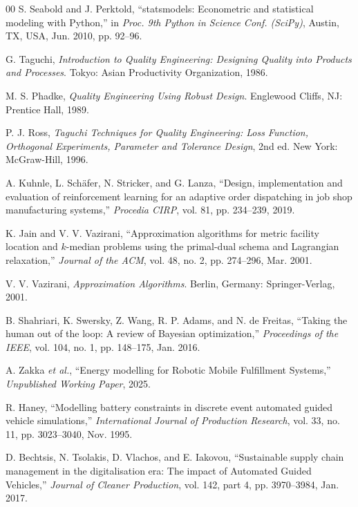 \documentclass[conference]{IEEEtran}
\begin{document}
\begin{thebibliography}{00}
S. Seabold and J. Perktold, ``statsmodels: Econometric and statistical modeling with Python,'' in \emph{Proc. 9th Python in Science Conf. (SciPy)}, Austin, TX, USA, Jun. 2010, pp. 92--96.

G. Taguchi, \emph{Introduction to Quality Engineering: Designing Quality into Products and Processes}. Tokyo: Asian Productivity Organization, 1986.

M. S. Phadke, \emph{Quality Engineering Using Robust Design}. Englewood Cliffs, NJ: Prentice Hall, 1989.

P. J. Ross, \emph{Taguchi Techniques for Quality Engineering: Loss Function, Orthogonal Experiments, Parameter and Tolerance Design}, 2nd ed. New York: McGraw-Hill, 1996.

A. Kuhnle, L. Schäfer, N. Stricker, and G. Lanza, ``Design, implementation and evaluation of reinforcement learning for an adaptive order dispatching in job shop manufacturing systems,'' \emph{Procedia CIRP}, vol. 81, pp. 234--239, 2019.

K. Jain and V. V. Vazirani, ``Approximation algorithms for metric facility location and $k$-median problems using the primal-dual schema and Lagrangian relaxation,'' \emph{Journal of the ACM}, vol. 48, no. 2, pp. 274--296, Mar. 2001.

V. V. Vazirani, \emph{Approximation Algorithms}. Berlin, Germany: Springer-Verlag, 2001.

B. Shahriari, K. Swersky, Z. Wang, R. P. Adams, and N. de Freitas, ``Taking the human out of the loop: A review of Bayesian optimization,'' \emph{Proceedings of the IEEE}, vol. 104, no. 1, pp. 148--175, Jan. 2016.

A. Zakka \emph{et al.}, ``Energy modelling for Robotic Mobile Fulfillment Systems,'' \emph{Unpublished Working Paper}, 2025.

R. Haney, ``Modelling battery constraints in discrete event automated guided vehicle simulations,'' \emph{International Journal of Production Research}, vol. 33, no. 11, pp. 3023--3040, Nov. 1995.

D. Bechtsis, N. Tsolakis, D. Vlachos, and E. Iakovou, ``Sustainable supply chain management in the digitalisation era: The impact of Automated Guided Vehicles,'' \emph{Journal of Cleaner Production}, vol. 142, part 4, pp. 3970--3984, Jan. 2017.


\end{thebibliography}
\end{document}
